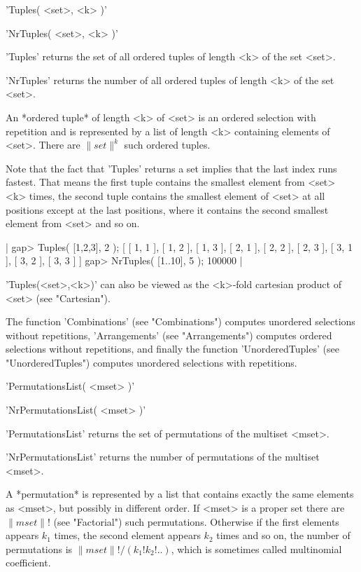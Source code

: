 %

'Tuples( <set>, <k> )'

'NrTuples( <set>, <k> )'

'Tuples' returns the set of all ordered tuples  of length <k> of  the set
<set>.

'NrTuples' returns the number of all ordered tuples  of length <k> of the
set <set>.

An *ordered tuple* of  length <k> of <set> is  an ordered selection  with
repetition and is represented by a list of length <k> containing elements
of <set>.  There are $\|set\|^k$ such ordered tuples.

Note that the fact  that 'Tuples' returns  a  set implies that   the last
index runs  fastest.  That means  the first tuple   contains the smallest
element from <set> <k>  times,  the  second tuple  contains the  smallest
element of <set> at all positions except at the  last positions, where it
contains the second smallest element from <set> and so on.

|    gap> Tuples( [1,2,3], 2 );
    [ [ 1, 1 ], [ 1, 2 ], [ 1, 3 ], [ 2, 1 ], [ 2, 2 ], [ 2, 3 ], 
      [ 3, 1 ], [ 3, 2 ], [ 3, 3 ] ]
    gap> NrTuples( [1..10], 5 );
    100000 |

'Tuples(<set>,<k>)' can also be viewed  as the <k>-fold cartesian product
of <set> (see "Cartesian").

The  function  'Combinations'  (see  "Combinations")  computes  unordered
selections  without   repetitions,  'Arrangements'  (see  "Arrangements")
computes ordered selections without repetitions, and finally the function
'UnorderedTuples' (see "UnorderedTuples")  computes unordered  selections
with repetitions.

%

'PermutationsList( <mset> )'

'NrPermutationsList( <mset> )'

'PermutationsList' returns the   set   of permutations of    the multiset
<mset>.

'NrPermutationsList' returns the  number of permutations  of the multiset
<mset>.

A *permutation* is represented by a  list  that contains exactly the same
elements as  <mset>,  but possibly in   different order.  If <mset>  is a
proper  set there are $\|mset\| !$ (see "Factorial")  such  permutations.
Otherwise if the  first elements appears $k_1$  times, the second element
appears  $k_2$  times   and   so  on,  the  number   of   permutations is
$\|mset\|! /  (k_1! k_2! ..)$,  which  is  sometimes  called  multinomial
coefficient.

